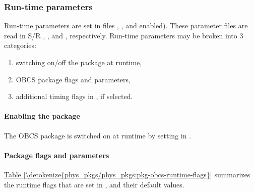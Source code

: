 \documentclass[letterpaper,10pt,english]{sphinxmanual}
\begin{document}
\subsubsection{Run-time parameters}
\label{\detokenize{phys_pkgs/phys_pkgs:pkg-obcs-runtime}}\label{\detokenize{phys_pkgs/phys_pkgs:run-time-parameters}}
Run-time parameters are set in files
, , and  enabled).
These parameter files are read in S/R
, , and
, respectively.
Run-time parameters may be broken into 3 categories:
\begin{enumerate}
\item {} 
switching on/off the package at runtime,

\item {} 
OBCS package flags and parameters,

\item {} 
additional timing flags in , if selected.

\end{enumerate}


\paragraph{Enabling the package}
\label{\detokenize{phys_pkgs/phys_pkgs:enabling-the-package}}
The OBCS package is switched on at runtime by setting
 in .


\paragraph{Package flags and parameters}
\label{\detokenize{phys_pkgs/phys_pkgs:package-flags-and-parameters}}
\hyperref[\detokenize{phys_pkgs/phys_pkgs:pkg-obcs-runtime-flags}]{Table \ref{\detokenize{phys_pkgs/phys_pkgs:pkg-obcs-runtime-flags}}} summarizes the
runtime flags that are set in , and
their default values.
\end{document}
